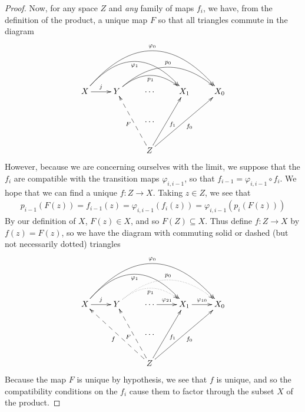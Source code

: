 \begin{claim}
\begin{proof}
            Now, for any space $Z$ and \emph{any} family of maps $f_i$, we have, from the definition of the product, a unique map $F$ so that all triangles commute in the diagram
            \begin{displaymath}
              \xymatrix{
                X \ar[r]^j \ar@/^37pt/[rrr]_{\varphi_1} \ar@/^50pt/[rrrr]^{\varphi_0}
                & Y \ar@/^20pt/[rr]_{p_1} \ar@/^30pt/[rrr]^{p_0}
                & \cdots
                & X_1
                & X_0
                \\ && \cdots \\
                && Z \ar@{-->}[uul]^F \ar[uur]_{f_1} \ar[uurr]_{f_0}
              }
            \end{displaymath}
            However, because we are concerning ourselves with the limit, we suppose that the $f_i$ are compatible with the transition maps $\varphi_{i,i-1}$, so that $f_{i-1} = \varphi_{i,i-1}\circ f_i$.
            We hope that we can find a unique $f:Z\rightarrow X$.
            Taking $z\in Z$, we see that
            \begin{align*}
              p_{i-1}(F(z)) = f_{i-1}(z) = \varphi_{i,i-1}(f_i(z)) = \varphi_{i,i-1}(p_i(F(z)))
            \end{align*}
            By our definition of $X$, $F(z)\in X$, and so $F(Z)\subseteq X$.
            Thus define $f:Z\rightarrow X$ by $f(z) = F(z)$, so we have the diagram with commuting solid or dashed (but not necessarily dotted) triangles
            \begin{displaymath}
              \xymatrix{
                X \ar[r]^j \ar@/^37pt/[rrr]_{\varphi_1} \ar@/^50pt/[rrrr]^{\varphi_0}
                & Y \ar@/^20pt/@{..>}[rr]_{p_1} \ar@/^30pt/@{..>}[rrr]^{p_0}
                & \cdots \ar[r]^{\varphi_{21}}
                & X_1 \ar[r]^{\varphi_{10}}
                & X_0
                \\ && \cdots \\
                && Z \ar@{-->}[uull]^f \ar@{-->}[uul]^F \ar[uur]_{f_1} \ar[uurr]_{f_0}
              }
            \end{displaymath}
            Because the map $F$ is unique by hypothesis, we see that $f$ is unique, and so the compatibility conditions on the $f_i$ cause them to factor through the subset $X$ of the product.
          \end{proof}
        \end{claim}

